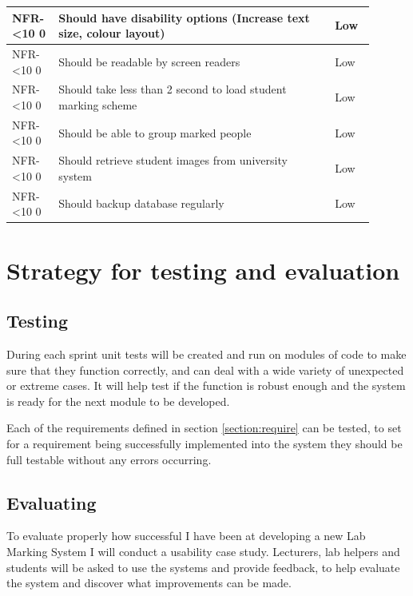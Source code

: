 \documentclass[12pt]{article}  %
\newcommand{\rid}[1]{\centering #1-\ifnum\value{requirement}<10 0\fi\arabic{requirement} \stepcounter{requirement}}
\begin{document}
\begin{spacing}{1.5}
\begin{longtable}{|p{0.1\linewidth}|p{0.7\linewidth}|p{0.1\linewidth}|}
\rid{NFR} & Should have disability options (Increase text size, colour layout) & Low\\ \hline
\rid{NFR} & Should be readable by screen readers & Low\\ \hline
\rid{NFR} & Should take less than 2 second to load student marking scheme & Low\\ \hline
\rid{NFR} & Should be able to group marked people & Low \\ \hline
\rid{NFR} & Should retrieve student images from university system & Low\\ \hline
\rid{NFR} & Should backup database regularly & Low\\ \hline


\end{longtable}
\end{spacing}
\setcounter{requirement}{1}



\newpage
\section{Strategy for testing and evaluation}

\subsection{Testing}
During each sprint unit tests will be created and run on modules of code to make sure that they function correctly, and can deal with a wide variety of unexpected or extreme cases. It will help test if the function is robust enough  and the system is ready for the next module to be developed.

Each of the requirements defined in section \ref{section:require} can be tested, to set for a requirement being successfully implemented into the system they should be full testable without any errors occurring.

\subsection{Evaluating}
To evaluate properly how successful I have been at developing a new Lab Marking System I will conduct a usability case study. Lecturers, lab helpers and students will be asked to use the systems and provide feedback, to help evaluate the system and discover what improvements can be made.
\end{document}
